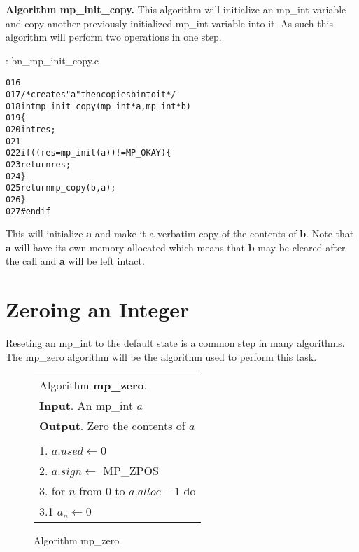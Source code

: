 \documentclass[b5paper]{book}
\begin{document}
\textbf{Algorithm mp\_init\_copy.}
This algorithm will initialize an mp\_int variable and copy another previously initialized mp\_int variable into it.  As 
such this algorithm will perform two operations in one step.  

\vspace{+3mm}\begin{small}
\hspace{-5.1mm}{\bf File}: bn\_mp\_init\_copy.c
\vspace{-3mm}
\begin{alltt}
016   
017   /* creates "a" then copies b into it */
018   int mp_init_copy (mp_int * a, mp_int * b)
019   \{
020     int     res;
021   
022     if ((res = mp_init (a)) != MP_OKAY) \{
023       return res;
024     \}
025     return mp_copy (b, a);
026   \}
027   #endif
\end{alltt}
\end{small}

This will initialize \textbf{a} and make it a verbatim copy of the contents of \textbf{b}.  Note that 
\textbf{a} will have its own memory allocated which means that \textbf{b} may be cleared after the call
and \textbf{a} will be left intact.  

\section{Zeroing an Integer}
Reseting an mp\_int to the default state is a common step in many algorithms.  The mp\_zero algorithm will be the algorithm used to
perform this task.

\begin{figure}[here]
\begin{center}
\begin{tabular}{l}
\hline Algorithm \textbf{mp\_zero}. \\
\textbf{Input}.   An mp\_int $a$ \\
\textbf{Output}.  Zero the contents of $a$ \\
\hline \\
1.  $a.used \leftarrow 0$ \\
2.  $a.sign \leftarrow$ MP\_ZPOS \\
3.  for $n$ from 0 to $a.alloc - 1$ do \\
\hspace{3mm}3.1  $a_n \leftarrow 0$ \\
\hline
\end{tabular}
\end{center}
\caption{Algorithm mp\_zero}
\end{figure}
\end{document}
